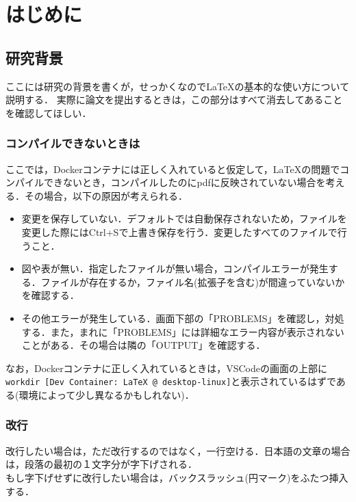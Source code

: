 \chapter{はじめに}\label{sec:Introduction} %
\section{研究背景}\label{sec:Background} %

ここには研究の背景を書くが，せっかくなので\LaTeX の基本的な使い方について説明する．
実際に論文を提出するときは，この部分はすべて消去してあることを確認してほしい．

\subsection*{コンパイルできないときは}\label{sec:コンパイル}

ここでは，Dockerコンテナには正しく入れていると仮定して，\LaTeX の問題でコンパイルできないとき，コンパイルしたのにpdfに反映されていない場合を考える．その場合，以下の原因が考えられる．
\begin{itemize}
    \item 変更を保存していない．デフォルトでは自動保存されないため，ファイルを変更した際にはCtrl+Sで上書き保存を行う．変更したすべてのファイルで行うこと．
    \item 図や表が無い．指定したファイルが無い場合，コンパイルエラーが発生する．ファイルが存在するか，ファイル名(拡張子を含む)が間違っていないかを確認する．
    \item その他エラーが発生している．画面下部の「PROBLEMS」を確認し，対処する．また，まれに「PROBLEMS」には詳細なエラー内容が表示されないことがある．その場合は隣の「OUTPUT」を確認する．
\end{itemize}

なお，Dockerコンテナに正しく入れているときは，VSCodeの画面の上部に\texttt{workdir [Dev Container: LaTeX @ desktop-linux]}と表示されているはずである(環境によって少し異なるかもしれない)．

\subsection{改行}\label{sec:改行}
改行したい場合は，ただ改行するのではなく，一行空ける．日本語の文章の場合は，段落の最初の１文字分が字下げされる．\\
もし字下げせずに改行したい場合は，バックスラッシュ(円マーク)をふたつ挿入する．

